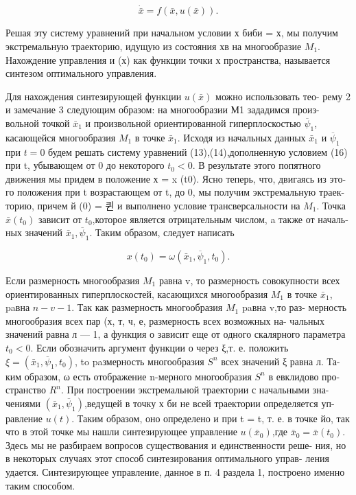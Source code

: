 \documentclass[10pt]{article}
\begin{document}
\[
\dot{\bar{x}} = f\left( {\bar{x},u\left( \bar{x}\right) }\right).
\]

Решая эту систему уравнений при начальном условии х биби = х, мы получим экстремальную траекторию, идущую из состояния хв на многообразие \({M}_{1}\). Нахождение управления и (х) как функции точки х пространства, называется синтезом оптимального управления.

Для нахождения синтезирующей функции \(u\left( \bar{x}\right)\) можно использовать тео- рему 2 и замечание 3 следующим образом: на многообразии М1 зададимся произ- вольной точкой \({\bar{x}}_{1}\) и произвольной ориентированной гиперплоскостью \({\overline{\psi }}_{1}\), касающейся многообразия \({M}_{1}\) в точке \({\bar{x}}_{1}\). Исходя из начальных данных \({\bar{x}}_{1}\) и \({\overline{\psi }}_{1}\) при \(t = 0\) будем решать систему уравнений (13),(14),дополненную условием (16) при t, убывающем от 0 до некоторого \({t}_{0} < 0\). В результате этого попятного движения мы придем в положение х = x (t0). Ясно теперь, что, двигаясь из это- го положения при t возрастающем от t, до 0, мы получим экстремальную траек- торию, причем й (0) = 퀸 и выполнено условие трансверсальности на \({M}_{1}\). Точка \(\bar{x}\left( {t}_{0}\right)\) зависит от \({t}_{0}\),которое является отрицательным числом, a также от началь- ных значений \({\bar{x}}_{1},{\overline{\psi }}_{1}\). Таким образом, следует написать

\[
x\left( {t}_{0}\right)  = \omega \left( {{\bar{x}}_{1},{\overline{\psi }}_{1},{t}_{0}}\right).
\]

Если размерность многообразия \({M}_{1}\) равна v, то размерность совокупности всех ориентированных гиперплоскостей, касающихся многообразия \({M}_{1}\) в точке \({\bar{x}}_{1}\), paвна \(n - v - 1\). Так как размерность многообразия \({M}_{1}\) paвна v,то раз- мерность многообразия всех пар (х, т, ч, е, размерность всех возможных на- чальных значений равна л — 1, а функция о зависит еще от одного скалярного параметра \({t}_{0} < 0\). Если обозначить аргумент функции о через ξ,т. е. положить \(\xi  = \left( {{\bar{x}}_{1},{\overline{\psi }}_{1},{t}_{0}}\right)\), to paзмерность многообразия \({S}^{n}\) всех значений ξ равна л. Та- ким образом, ω есть отображение n-мерного многообразия \({S}^{n}\) в евклидово про- странство \({R}^{n}\). При построении экстремальной траектории с начальными зна- чениями \(\left( {{\bar{x}}_{1},{\overline{\psi }}_{1}}\right)\),ведущей в точку х би не всей траектории определяется уп- равление \(u\left( t\right)\). Таким образом, оно определено и при t = t, т. е. в точке йо, так что в этой точке мы нашли синтезирующее управление \(u\left( {\bar{x}}_{0}\right)\),где \({\bar{x}}_{0} = \bar{x}\left( {t}_{0}\right)\). Здесь мы не разбираем вопросов существования и единственности реше- ния, но в некоторых случаях этот способ синтезирования оптимального управ- ления удается. Синтезирующее управление, данное в п. 4 раздела 1, построено именно таким способом.
\end{document}
